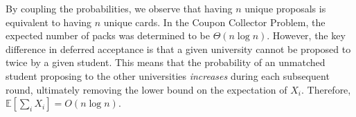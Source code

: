 \documentclass[12pt]{article}%
\begin{document}
By coupling the probabilities, we observe that having $n$ unique proposals is equivalent to having $n$ unique cards. In the Coupon Collector Problem, the expected number of packs was determined to be $\Theta(n \log n)$. However, the key difference in deferred acceptance is that a given university cannot be proposed to twice by a given student. This means that the probability of an unmatched student proposing to the other universities \emph{increases} during each subsequent round, ultimately removing the lower bound on the expectation of $X_i$. Therefore, $\mathbb{E}[\sum_i X_i] = O(n \log n)$.
\end{document}
